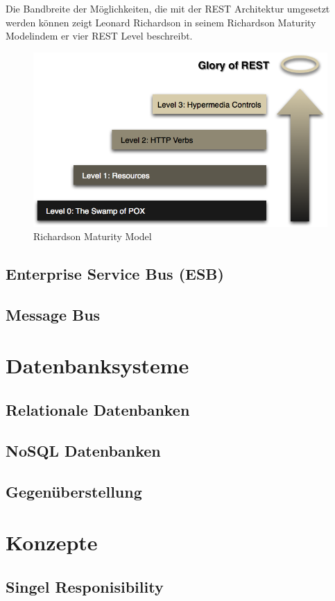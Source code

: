 	Die Bandbreite der Möglichkeiten, die mit der REST Architektur umgesetzt werden können zeigt Leonard Richardson in seinem \textacutedbl Richardson Maturity Model\textgravedbl indem er vier REST Level beschreibt.

	\begin{figure}[h]
		\centering
		\includegraphics[width=0.7\linewidth]{images/Richardson_Maturity_Model}
		\caption{Richardson Maturity Model}
		\label{fig:Richardson_Maturity_Model}
	\end{figure}
	
	\cite[vgl.][]{Fowler.2010}
	\subsection{Enterprise Service Bus (ESB)}
	\subsection{Message Bus}

\section{Datenbanksysteme}
	\subsection{Relationale Datenbanken}
	\subsection{NoSQL Datenbanken}
	\subsection{Gegenüberstellung}
	
\section{Konzepte}
	\subsection{Singel Responisibility}
